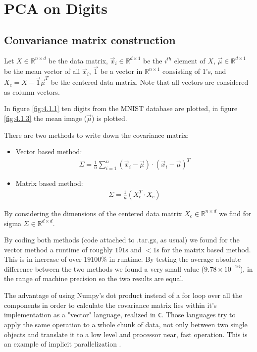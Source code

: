 \documentclass[12pt]{article}
\begin{document}
\newpage


\section{PCA on Digits}

\subsection{Convariance matrix construction}

Let $X\in \mathbb{R}^{n\times d}$ be the data matrix, $\vec{x}_i \in \mathbb{R}^{d\times 1}$ be the $i^{th}$ element of $X$, $\vec{\mu} \in \mathbb{R}^{d\times 1}$ be the mean vector of all $\vec{x}_i$, $\vec{1}$ be a vector in $\mathbb{R}^{n\times 1}$ consisting of 1's, and $X_c = X - \vec{1}\vec{\mu}^T$ be the centered data matrix. Note that all vectors are considered as column vectors. \par
In figure \ref{fig:4.1.1} ten digits from the MNIST database are plotted, in figure \ref{fig:4.1.3} the mean image ($\vec{\mu}$) is plotted. \par 
There are two methods to write down the covariance matrix:
\begin{itemize}
	\item Vector based method:
	\begin{align}
	\Sigma = \frac{1}{n}\sum_{i = 1}^{n} (\vec{x}_i - \vec{\mu})\cdot (\vec{x}_i - \vec{\mu})^T
	\end{align}
	\item Matrix based method:
	\begin{align}
	\Sigma = \frac{1}{n} (X_c^T\cdot X_c)
	\end{align}
\end{itemize}
By considering the dimensions of the centered data matrix $X_c \in \mathbb{R}^{n\times d}$ we find for sigma $\Sigma \in \mathbb{R}^{d\times d}$. \par 
By coding both methods (code attached to .tar.gz, as usual) we found for the vector method a runtime of roughly $191\text{s}$ and $<1$s for the matrix based method. This is in increase of over $19100\%$ in runtime. By testing the average absolute difference between the two methods we found a very small value ($9.78\times 10^{-16}$), in the range of machine precision so the two results are equal. \par 
The advantage of using Numpy's dot product instead of a for loop over all the components in order to calculate the covariance matrix lies within it's implementation as a "vector" language, realized in \texttt{C}. Those languages try to apply the same operation to a whole chunk of data, not only between two single objects and translate it to a low level and processor near, fast operation. This is an example of implicit parallelization \cite{wikip}.  
\end{document}
